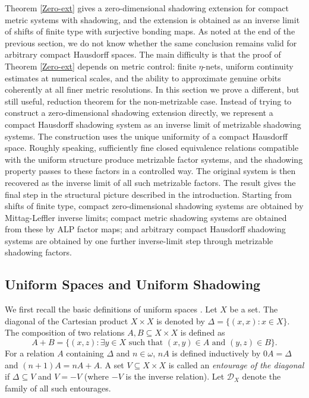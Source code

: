 \documentclass[10pt,a4paper]{amsart}
\numberwithin{equation}{section}
\begin{document}
Theorem \ref{Zero-ext} gives a zero-dimensional shadowing extension for compact metric systems with shadowing, and the extension is obtained as an inverse limit of shifts of finite type with surjective bonding maps. As noted at the end of the previous section, we do not know whether the same conclusion remains valid for arbitrary compact Hausdorff spaces. The main difficulty is that the proof of Theorem \ref{Zero-ext} depends on metric control: finite $\eta$-nets, uniform continuity estimates at numerical scales, and the ability to approximate genuine orbits coherently at all finer metric resolutions. In this section we prove a different, but still useful, reduction theorem for the non-metrizable case. Instead of trying to construct a zero-dimensional shadowing extension directly, we represent a compact Hausdorff shadowing system as an inverse limit of metrizable shadowing systems. The construction uses the unique uniformity of a compact Hausdorff space. Roughly speaking, sufficiently fine closed equivalence relations compatible with the uniform structure produce metrizable factor systems, and the shadowing property passes to these factors in a controlled way. The original system is then recovered as the inverse limit of all such metrizable factors. The result gives the final step in the structural picture described in the introduction. Starting from shifts of finite type, compact zero-dimensional shadowing systems are obtained by Mittag-Leffler inverse limits; compact metric shadowing systems are obtained from these by ALP factor maps; and arbitrary compact Hausdorff shadowing systems are obtained by one further inverse-limit step through metrizable shadowing factors.

\subsection{Uniform Spaces and Uniform Shadowing}

We first recall the basic definitions of uniform spaces \cite{Eng}. Let $X$ be a set. The diagonal of the Cartesian product $X \times X$ is denoted by $\Delta = \{ (x, x) : x \in X \}$. The composition of two relations $A, B \subseteq X \times X$ is defined as 
\[A + B = \{ (x, z) : \exists y \in X \text{ such that } (x, y) \in A \text{ and } (y, z) \in B \}.\]
 For a relation $A$ containing $\Delta$ and $n \in \omega$, $nA$ is defined inductively by $0A = \Delta$ and $(n+1)A = nA + A$. A set $V \subseteq X \times X$ is called an \emph{entourage of the diagonal} if $\Delta \subseteq V$ and $V = -V$ (where $-V$ is the inverse relation). Let $\mathcal{D}_X$ denote the family of all such entourages. 
\end{document}
